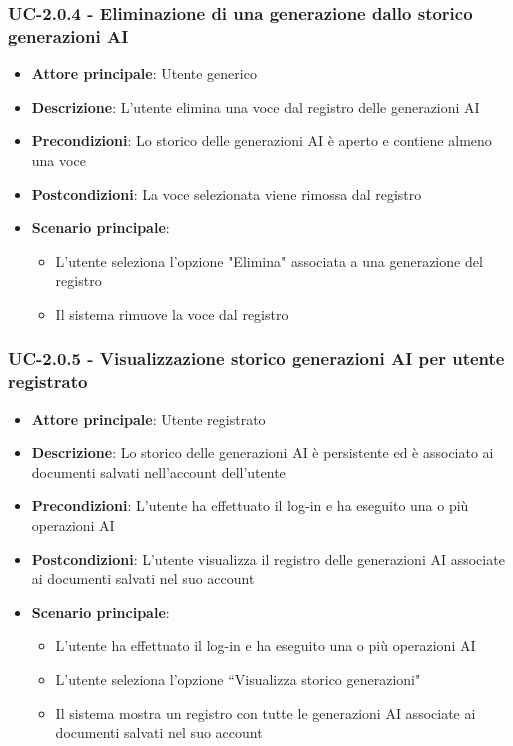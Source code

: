\documentclass[11pt,a4paper]{article}
\begin{document}
\subsubsection{UC-2.0.4 - Eliminazione di una generazione dallo storico generazioni AI}
\begin{itemize}
    \item \textbf{Attore principale}: Utente generico
    \item \textbf{Descrizione}: L'utente elimina una voce dal registro delle generazioni AI
    \item \textbf{Precondizioni}: Lo storico delle generazioni AI è aperto e contiene almeno una voce
    \item \textbf{Postcondizioni}: La voce selezionata viene rimossa dal registro
    \item \textbf{Scenario principale}:
        \begin{itemize}
            \item L'utente seleziona l'opzione "Elimina" associata a una generazione del registro
            \item Il sistema rimuove la voce dal registro
        \end{itemize}
\end{itemize}

\subsubsection{UC-2.0.5 - Visualizzazione storico generazioni AI per utente registrato}
\begin{itemize}
    \item \textbf{Attore principale}: Utente registrato
    \item \textbf{Descrizione}: Lo storico delle generazioni AI è persistente ed è associato ai documenti salvati nell’account dell’utente
    \item \textbf{Precondizioni}: L’utente ha effettuato il log-in e ha eseguito una o più operazioni AI
    \item \textbf{Postcondizioni}: L’utente visualizza il registro delle generazioni AI associate ai documenti salvati nel suo account
    \item \textbf{Scenario principale}:
        \begin{itemize}
            \item L'utente ha effettuato il log-in e ha eseguito una o più operazioni AI
            \item L’utente seleziona l’opzione “Visualizza storico generazioni"
            \item Il sistema mostra un registro con tutte le generazioni AI associate ai documenti salvati nel suo account
        \end{itemize}
\end{itemize}
\end{document}
